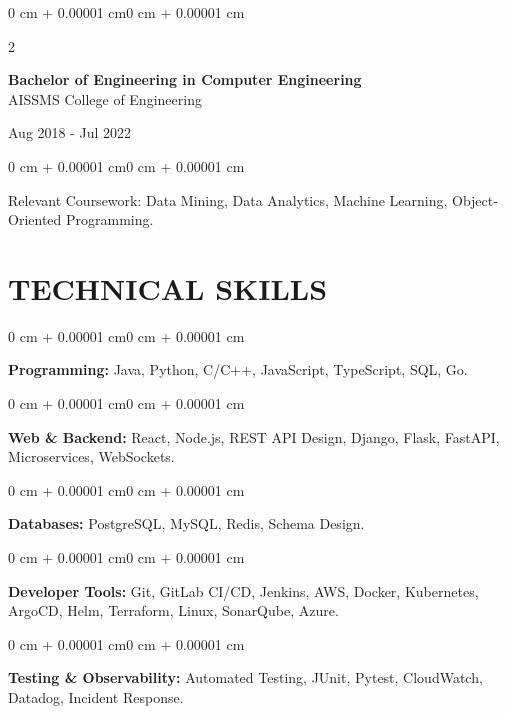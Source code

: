\documentclass[10pt, letterpaper]{article}
\newenvironment{onecolentry}{
    \begin{adjustwidth}{0 cm + 0.00001 cm}{0 cm + 0.00001 cm}
}{
    \end{adjustwidth}
}
\newenvironment{twocolentry}[2][]{
    \onecolentry
    \def\secondColumn{#2}
    \setcolumnwidth{\fill, 4.5 cm}
    \begin{paracol}{2}
}{
    \switchcolumn \raggedleft \secondColumn
    \end{paracol}
    \endonecolentry
}
\begin{document}
\begin{twocolentry}{
    Aug 2018 - Jul 2022
}
    \textbf{Bachelor of Engineering in Computer Engineering} \\
    AISSMS College of Engineering
\end{twocolentry}
\begin{onecolentry}
Relevant Coursework: Data Mining, Data Analytics, Machine Learning, Object-Oriented Programming.
\end{onecolentry}
\section{TECHNICAL SKILLS}
\begin{onecolentry}
\textbf{Programming:} Java, Python, C/C++, JavaScript, TypeScript, SQL, Go.
\end{onecolentry}
\vspace{0.06 cm}
\begin{onecolentry}
\textbf{Web \& Backend:} React, Node.js, REST API Design, Django, Flask, FastAPI, Microservices, WebSockets.
\end{onecolentry}
\vspace{0.06 cm}
\begin{onecolentry}
\textbf{Databases:} PostgreSQL, MySQL, Redis, Schema Design.
\end{onecolentry}
\vspace{0.06 cm}
\begin{onecolentry}
\textbf{Developer Tools:} Git, GitLab CI/CD, Jenkins, AWS, Docker, Kubernetes, ArgoCD, Helm, Terraform, Linux, SonarQube, Azure.
\end{onecolentry}
\vspace{0.06 cm}
\begin{onecolentry}
\textbf{Testing \& Observability:} Automated Testing, JUnit, Pytest, CloudWatch, Datadog, Incident Response.
\end{onecolentry}

\end{document}
